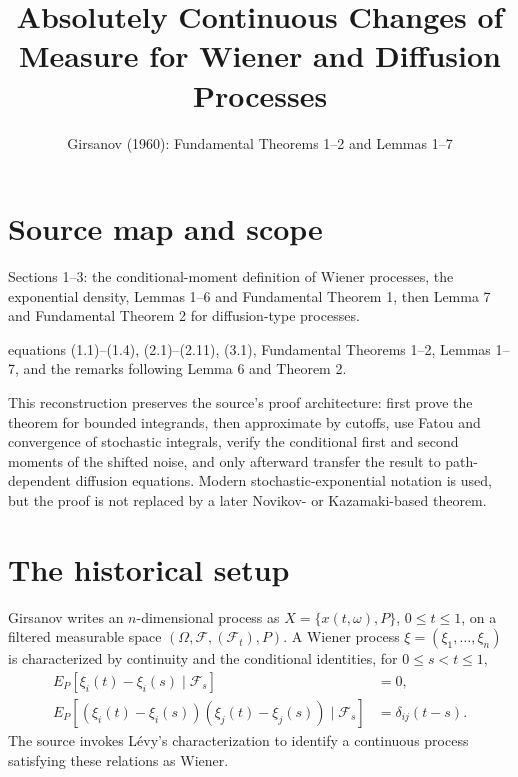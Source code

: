 
\title{Absolutely Continuous Changes of Measure for Wiener and Diffusion Processes}
\author{}
\date{Girsanov (1960): Fundamental Theorems 1--2 and Lemmas 1--7}

\maketitle

\section*{Source map and scope}
\begin{description}[style=nextline,leftmargin=3.2cm,labelwidth=3cm]
\item[Primary source] \texttt{}
\item[Coverage] Sections 1--3: the conditional-moment definition of Wiener processes, the exponential density, Lemmas 1--6 and Fundamental Theorem 1, then Lemma 7 and Fundamental Theorem 2 for diffusion-type processes.
\item[Source anchors] equations (1.1)--(1.4), (2.1)--(2.11), (3.1), Fundamental Theorems 1--2, Lemmas 1--7, and the remarks following Lemma 6 and Theorem 2.
\end{description}

This reconstruction preserves the source's proof architecture: first prove the theorem for bounded
integrands, then approximate by cutoffs, use Fatou and convergence of stochastic integrals, verify the
conditional first and second moments of the shifted noise, and only afterward transfer the result to
path-dependent diffusion equations.  Modern stochastic-exponential notation is used, but the proof is
not replaced by a later Novikov- or Kazamaki-based theorem.

\section{The historical setup}
Girsanov writes an \(n\)-dimensional process as \(X=\{x(t,\omega),P\}\), \(0\le t\le1\), on a
filtered measurable space \((\Omega,\mathcal F,(\mathcal F_t),P)\).  A Wiener process
\(\xi=(\xi_1,\dots,\xi_n)\) is characterized by continuity and the conditional identities, for
\(0\le s<t\le1\),
\begin{align}
 E_P[\xi_i(t)-\xi_i(s)\mid\mathcal F_s]&=0,\label{eq:girs-cond1}\\
 E_P[(\xi_i(t)-\xi_i(s))(\xi_j(t)-\xi_j(s))\mid\mathcal F_s]
 &=\delta_{ij}(t-s).\label{eq:girs-cond2}
\end{align}
The source invokes L\'evy's characterization to identify a continuous process satisfying these
relations as Wiener.

